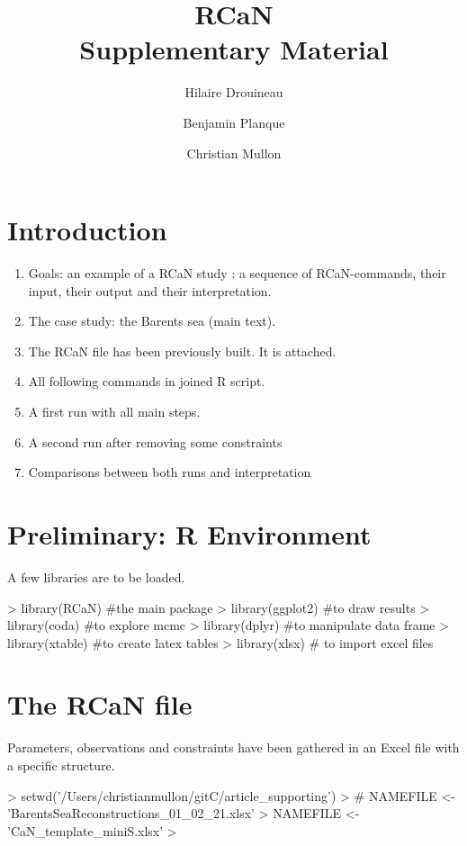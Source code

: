 \documentclass{article}
\title{ \bf{RCaN \\ \vspace{1cm} Supplementary Material \vspace{1cm}} }
\author[1]{Hilaire Drouineau}
\affil[1]{INRAE, Bordeaux, France}
\author[2]{Benjamin Planque}
\affil[2]{HI, Tromsoe, Norway}
\author[3]{Christian Mullon}
\affil[3]{IRD, MARBEC, Sete, France}
\begin{document}



\maketitle

\section{Introduction}
\begin{enumerate}
\item Goals: an example of a RCaN study : a sequence of RCaN-commands, their input, their output and their interpretation.
\item The case study: the Barents sea (main text).
\item The RCaN file has been previously built. It is attached.
\item All following commands in joined R script.
\item A first run with all main steps.
\item A second run after removing some constraints
\item Comparisons between both runs and interpretation
\end{enumerate}
\section{Preliminary: R Environment}
A few libraries are to be loaded.

\begin{Schunk}
\begin{Sinput}
> library(RCaN) #the main package
> library(ggplot2) #to draw results
> library(coda) #to explore mcmc 
> library(dplyr) #to manipulate data frame
> library(xtable) #to create latex tables
> library(xlsx) # to import excel files
\end{Sinput}
\end{Schunk}

\clearpage

\section{The RCaN file}
Parameters, observations and constraints have been gathered in an Excel file with a specific structure. 

\begin{Schunk}
\begin{Sinput}
> setwd('/Users/christianmullon/gitC/article_supporting')
> # NAMEFILE <- 'BarentsSeaReconstructions_01_02_21.xlsx'
> NAMEFILE <- 'CaN_template_miniS.xlsx'
> 
\end{Sinput}
\end{Schunk}
\end{document}

